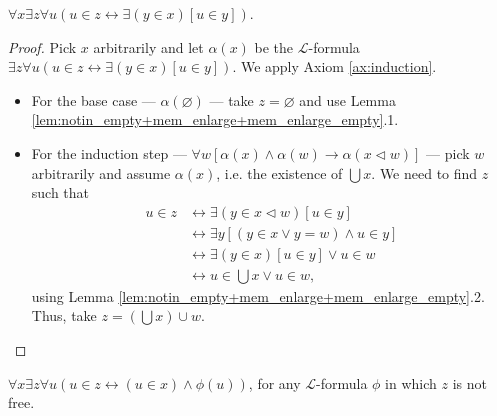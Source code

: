 \begin{theorem}
    \label{thm:exists_sUnion}
    \leanok
    $\forall x \exists z \forall u (u \in z \leftrightarrow \exists (y\in x)[u \in y])$.
\end{theorem}

\begin{proof}
    \leanok
    Pick $x$ arbitrarily and let $\alpha (x)$ be the $\mathcal{L}$-formula 
    $\exists z \forall u (u \in z \leftrightarrow \exists (y\in x)[u \in y])$.
    We apply Axiom \ref{ax:induction}.
    \begin{itemize}
        \item For the base case — $\alpha (\varnothing)$ — take $z=\varnothing$ and use 
        Lemma \ref{lem:notin_empty+mem_enlarge+mem_enlarge_empty}.1.
        \item For the induction step 
        — $\forall w[\alpha(x) \land \alpha(w) \rightarrow \alpha(x \lhd w)]$ — 
        pick $w$ arbitrarily and assume $\alpha(x)$, i.e. the existence of $\bigcup x$.
        We need to find $z$ such that
        \begin{equation*}
        \begin{split}
            u \in z & \leftrightarrow \exists (y \in x \lhd w)[u \in y]\\
            & \leftrightarrow \exists y[(y \in x \lor y = w) \land u \in y]\\
            & \leftrightarrow \exists(y \in x)[u \in y] \lor u \in w\\
            & \leftrightarrow u \in \bigcup x \lor u \in w,
        \end{split}
        \end{equation*}
        using Lemma \ref{lem:notin_empty+mem_enlarge+mem_enlarge_empty}.2. 
        Thus, take $z = (\bigcup x) \cup w$.
    \end{itemize}
\end{proof}

\begin{theorem}
    \label{thm:comp_scheme}
    \leanok
    $\forall x \exists z \forall u (u\in z \leftrightarrow (u \in x) \land \phi (u))$, 
    for any $\mathcal{L}$-formula $\phi$ in which $z$ is not free.
\end{theorem}

